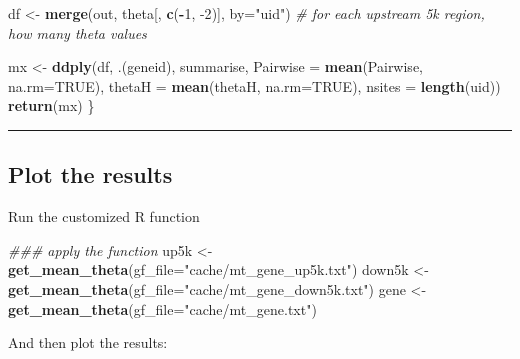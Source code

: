 \documentclass[]{article}
\newenvironment{Shaded}{\begin{snugshade}}{\end{snugshade}}
\newcommand{\CommentTok}[1]{\textcolor[rgb]{0.56,0.35,0.01}{\textit{#1}}}
\newcommand{\DataTypeTok}[1]{\textcolor[rgb]{0.13,0.29,0.53}{#1}}
\newcommand{\DecValTok}[1]{\textcolor[rgb]{0.00,0.00,0.81}{#1}}
\newcommand{\KeywordTok}[1]{\textcolor[rgb]{0.13,0.29,0.53}{\textbf{#1}}}
\newcommand{\NormalTok}[1]{#1}
\newcommand{\OperatorTok}[1]{\textcolor[rgb]{0.81,0.36,0.00}{\textbf{#1}}}
\newcommand{\OtherTok}[1]{\textcolor[rgb]{0.56,0.35,0.01}{#1}}
\newcommand{\StringTok}[1]{\textcolor[rgb]{0.31,0.60,0.02}{#1}}
\begin{document}
\begin{Shaded}
\begin{Highlighting}[]
\NormalTok{  df <-}\StringTok{ }\KeywordTok{merge}\NormalTok{(out, theta[, }\KeywordTok{c}\NormalTok{(}\OperatorTok{-}\DecValTok{1}\NormalTok{, }\DecValTok{-2}\NormalTok{)], }\DataTypeTok{by=}\StringTok{"uid"}\NormalTok{)}
  \CommentTok{# for each upstream 5k region, how many theta values}

\NormalTok{  mx <-}\StringTok{ }\KeywordTok{ddply}\NormalTok{(df, .(geneid), summarise,}
            \DataTypeTok{Pairwise =} \KeywordTok{mean}\NormalTok{(Pairwise, }\DataTypeTok{na.rm=}\OtherTok{TRUE}\NormalTok{),}
            \DataTypeTok{thetaH =} \KeywordTok{mean}\NormalTok{(thetaH, }\DataTypeTok{na.rm=}\OtherTok{TRUE}\NormalTok{),}
            \DataTypeTok{nsites =} \KeywordTok{length}\NormalTok{(uid))}
  \KeywordTok{return}\NormalTok{(mx)}
\NormalTok{\}}
\end{Highlighting}
\end{Shaded}

\begin{center}\rule{0.5\linewidth}{0.5pt}\end{center}

\hypertarget{plot-the-results}{%
\subsection{Plot the results}\label{plot-the-results}}

Run the customized R function

\begin{Shaded}
\begin{Highlighting}[]
\CommentTok{### apply the function}
\NormalTok{up5k <-}\StringTok{ }\KeywordTok{get_mean_theta}\NormalTok{(}\DataTypeTok{gf_file=}\StringTok{"cache/mt_gene_up5k.txt"}\NormalTok{)}
\NormalTok{down5k <-}\StringTok{ }\KeywordTok{get_mean_theta}\NormalTok{(}\DataTypeTok{gf_file=}\StringTok{"cache/mt_gene_down5k.txt"}\NormalTok{)}
\NormalTok{gene <-}\StringTok{ }\KeywordTok{get_mean_theta}\NormalTok{(}\DataTypeTok{gf_file=}\StringTok{"cache/mt_gene.txt"}\NormalTok{)}
\end{Highlighting}
\end{Shaded}

And then plot the results:
\end{document}
